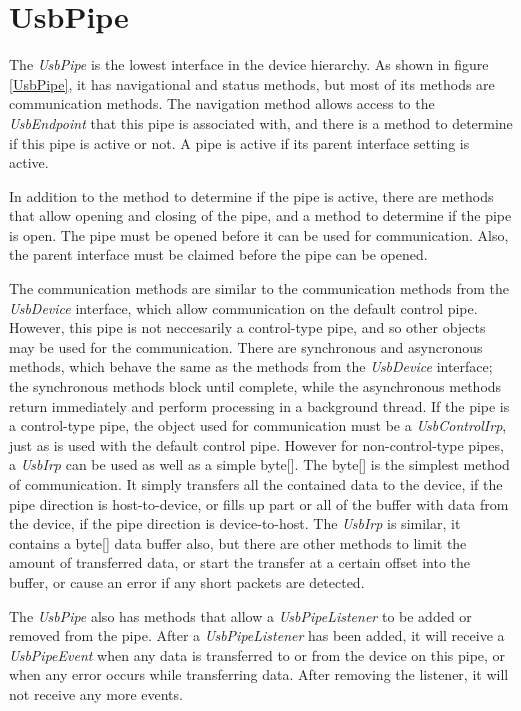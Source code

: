 \documentclass{article}
\newcommand{\myclass}[1]{\emph{#1}}
\newcommand{\myinterface}[1]{\emph{#1}}
\begin{document}
%

\section{UsbPipe}

The \myinterface{UsbPipe} is the lowest interface in the device hierarchy.  As shown in
figure \ref{UsbPipe}, it has navigational and status methods, but most of
its methods are communication methods.  The navigation method allows
access to the \myinterface{UsbEndpoint} that this pipe is associated with, and there
is a method to determine if this pipe is active or not.  A pipe is
active if its parent interface setting is active.

In addition to the method to determine if the pipe is active, there
are methods that allow opening and closing of the pipe, and a method
to determine if the pipe is open.  The pipe must be opened before
it can be used for communication.  Also, the parent interface must
be claimed before the pipe can be opened.

The communication methods are similar to the communication methods
from the \myinterface{UsbDevice} interface, which allow communication on the default
control pipe.  However, this pipe is not neccesarily a control-type pipe,
and so other objects may be used for the communication.  There are
synchronous and asyncronous methods, which behave the same as the
methods from the \myinterface{UsbDevice} interface; the synchronous methods block
until complete, while the asynchronous methods return immediately
and perform processing in a background thread.  If the pipe is a
control-type pipe, the object used for communication must be
a \myinterface{UsbControlIrp}, just as is used with the default control pipe.
However for non-control-type pipes, a \myinterface{UsbIrp} can be used as
well as a simple byte[].  The byte[] is the simplest method
of communication.  It simply transfers all the contained data
to the device, if the pipe direction is host-to-device, or fills up
part or all of the buffer with data from the device, if the pipe
direction is device-to-host.  The \myinterface{UsbIrp} is similar, it contains
a byte[] data buffer also, but there are other methods to limit
the amount of transferred data, or start the transfer at a certain offset
into the buffer, or cause an error if any short packets are detected.

The \myinterface{UsbPipe} also has methods that allow a \myinterface{UsbPipeListener} to be added or removed
from the pipe.  After a \myinterface{UsbPipeListener} has been added, it will receive a
\myclass{UsbPipeEvent} when any data is transferred to or from the device on this pipe,
or when any error occurs while transferring data.  After removing the listener,
it will not receive any more events.
\end{document}
